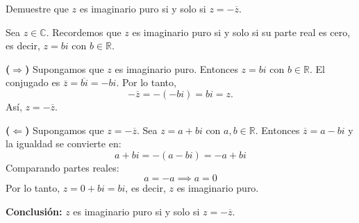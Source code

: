 \begin{prob} 
Demuestre que $z$ es imaginario puro si y solo si $z=-\overline{z}$.
\begin{myproof}
Sea $z \in \mathbb{C}$. Recordemos que $z$ es imaginario puro si y solo si su parte real es cero, es decir, $z = bi$ con $b \in \mathbb{R}$.

\textbf{($\Rightarrow$)} Supongamos que $z$ es imaginario puro.  
Entonces $z = bi$ con $b \in \mathbb{R}$.  
El conjugado es $\overline{z} = \overline{bi} = -bi$.  
Por lo tanto,
\[
-\overline{z} = -(-bi) = bi = z.
\]
Así, $z = -\overline{z}$.

\textbf{($\Leftarrow$)} Supongamos que $z = -\overline{z}$.  
Sea $z = a + bi$ con $a, b \in \mathbb{R}$.  
Entonces $\overline{z} = a - bi$ y la igualdad se convierte en:
\[
a + bi = - (a - bi) = -a + bi
\]
Comparando partes reales:
\[
a = -a \implies a = 0
\]
Por lo tanto, $z = 0 + bi = bi$, es decir, $z$ es imaginario puro.

\textbf{Conclusión:}  
$z$ es imaginario puro si y solo si $z = -\overline{z}$.
\end{myproof}

\end{prob}